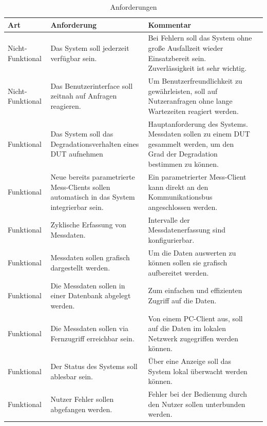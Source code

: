 \begin{table}[H]
\begin{center}
\begin{tabularx}{\textwidth}{|p{3cm}|X|X|X|}\hline
Art & Anforderung & Kommentar \\ \hline
Nicht-Funktional & Das System soll jederzeit verfügbar sein. & Bei Fehlern soll das System ohne große Ausfallzeit wieder Einsatzbereit sein. Zuverlässigkeit ist sehr wichtig.\\ \hline
Nicht-Funktional & Das Benutzerinterface soll zeitnah auf Anfragen reagieren. & Um Benutzerfreundlichkeit zu gewährleisten, soll auf Nutzeranfragen ohne lange Wartezeiten reagiert werden. \\ \hline
Funktional & Das System soll das Degradationsverhalten eines \ac{DUT} aufnehmen & Hauptanforderung des Systems. Messdaten sollen zu einem \ac{DUT} gesammelt werden, um den Grad der Degradation bestimmen zu können. \\ \hline
Funktional & Neue bereits parametrierte Mess-Clients sollen automatisch in das System integrierbar sein. & Ein parametrierter Mess-Client kann direkt an den Kommunikationsbus angeschlossen werden.\\ \hline
Funktional & Zyklische Erfassung von Messdaten. & Intervalle der Messdatenerfassung sind konfigurierbar.\\ \hline
Funktional & Messdaten sollen grafisch dargestellt werden. & Um die Daten auswerten zu können sollen sie grafisch aufbereitet werden.\\ \hline
Funktional & Die Messdaten sollen in einer Datenbank abgelegt werden. & Zum einfachen und effizienten Zugriff auf die Daten.\\ \hline
Funktional & Die Messdaten sollen via Fernzugriff erreichbar sein. & Von einem PC-Client aus, soll auf die Daten im lokalen Netzwerk zugegriffen werden können.\\ \hline
Funktional & Der Status des Systems soll ablesbar sein. & Über eine Anzeige soll das System lokal überwacht werden können.\\ \hline
Funktional & Nutzer Fehler sollen abgefangen werden. & Fehler bei der Bedienung durch den Nutzer sollen unterbunden werden.\\ \hline
\end{tabularx}
\caption{Anforderungen}
\label{table_Anforderungen}
\end{center}
\end{table}








